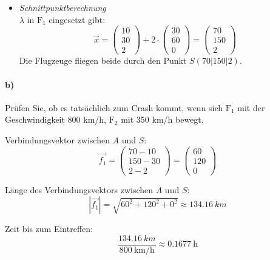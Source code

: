 \documentclass{ajc}
\numberwithin{equation}{subsection}
\begin{document}
\begin{itemize}
		\item \textit{Schnittpunktberechnung} \\
		$\lambda$ in $\text{F}_1$ eingesetzt gibt: 
		\begin{equation}
			\overrightarrow{x}=\left(\begin{array}{r} 10 \\ 30 \\ 2\end{array}\right) + 2 \cdot \left(\begin{array}{r} 30 \\ 60 \\ 0\end{array}\right) = \left(\begin{array}{r} 70 \\ 150 \\ 2\end{array}\right)
		\end{equation}
		Die Flugzeuge fliegen beide durch den Punkt $S(70|150|2)$.
	\end{itemize}
	
	\paragraph{b)} Prüfen Sie, ob es tatsächlich zum Crash kommt, wenn sich $\text{F}_1$ mit der Geschwindigkeit 800 km/h, $\text{F}_2$ mit 350 km/h bewegt.
	
	Verbindungsvektor zwischen $A$ und $S$:
	\begin{equation}
		\overrightarrow{f_1} = \left(\begin{array}{r} 70 - 10 \\ 150 - 30 \\ 2 - 2\end{array}\right) = \left(\begin{array}{r} 60 \\ 120 \\ 0\end{array}\right) 
	\end{equation}
		
	Länge des Verbindungsvektors zwischen $A$ und $S$:
	\begin{equation}
		\left|\overrightarrow{f_1}\right| = \sqrt{60^2 + 120^2 + 0^2} \approx \SI{134,16}{km}
	\end{equation}
	
	Zeit bis zum Eintreffen:
	\begin{equation}
		\frac{\SI{134,16}{km}}{\SI{800}{\km\per\hour}} \approx \SI{0,1677}{\hour}
	\end{equation}
	
\end{document}
